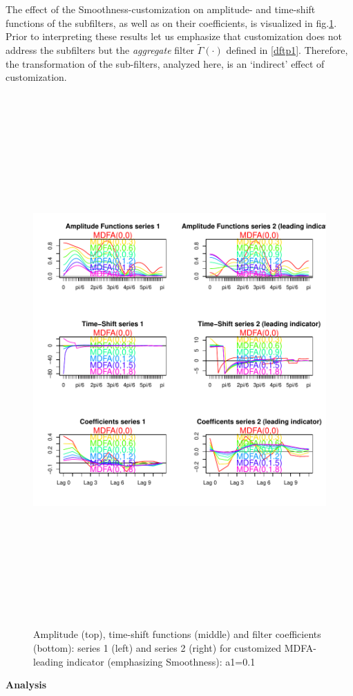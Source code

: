 \documentclass[a4paper]{book}
\begin{document}
The effect of the Smoothness-customization on amplitude- and time-shift functions of the subfilters, as well as on their coefficients, is visualized in fig.\ref{z_amp_shift_mdfacust_leadind_S}. Prior to interpreting these results let us emphasize that customization does not address the subfilters but the \emph{aggregate} filter $\tilde{\Gamma}(\cdot)$ defined in \ref{dftp1}. Therefore, the transformation of the sub-filters, analyzed here, is an `indirect' effect of customization.

\begin{figure}[H]\begin{center}\includegraphics[height=8in, width=5in]{z_amp_shift_mdfacust_leadind_S}\caption{Amplitude (top), time-shift functions (middle) and filter coefficients (bottom): series 1 (left) and series 2 (right) for customized MDFA-leading indicator (emphasizing Smoothness): a1=0.1\label{z_amp_shift_mdfacust_leadind_S}}\end{center}\end{figure}\textbf{Analysis}
\end{document}
